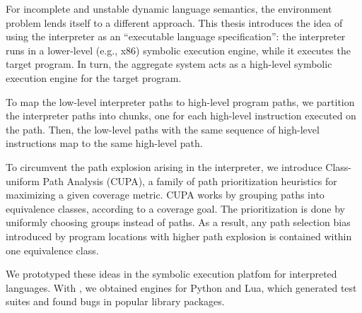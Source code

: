 

For incomplete and unstable dynamic language semantics, the environment problem lends itself to a different approach.
%
This thesis introduces the idea of using the interpreter as an ``executable language specification'': the interpreter runs in a lower-level (e.g., x86) symbolic execution engine, while it executes the target program.  In turn, the aggregate system acts as a high-level symbolic execution engine for the target program.


To map the low-level interpreter paths to high-level program paths, we partition the interpreter paths into chunks, one for each high-level instruction executed on the path. Then, the low-level paths with the same sequence of high-level instructions map to the same high-level path.

To circumvent the path explosion arising in the interpreter, we introduce Class-uniform Path Analysis (CUPA), a family of path prioritization heuristics for maximizing a given coverage metric.
%
CUPA works by grouping paths into equivalence classes, according to a coverage goal.  The prioritization is done by uniformly choosing groups instead of paths.  As a result, any path selection bias introduced by program locations with higher path explosion is contained within one equivalence class.



We prototyped these ideas in the \chef symbolic execution platfom for interpreted languages.  With \chef, we obtained engines for Python and Lua, which generated test suites and found bugs in popular library packages.

